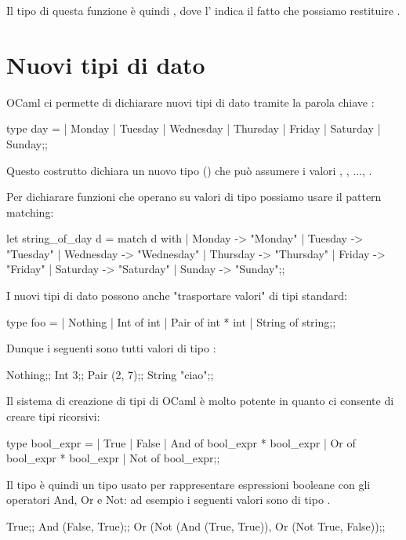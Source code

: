 Il tipo di questa funzione è quindi , dove l' indica il fatto che possiamo restituire .

\section{Nuovi tipi di dato}

OCaml ci permette di dichiarare nuovi tipi di dato tramite la parola chiave :
\begin{OCaml}
    type day = 
        | Monday
        | Tuesday
        | Wednesday
        | Thursday
        | Friday
        | Saturday
        | Sunday;;
\end{OCaml}
Questo costrutto dichiara un nuovo tipo () che può assumere i valori , , ..., .

Per dichiarare funzioni che operano su valori di tipo  possiamo usare il pattern matching:
\begin{OCaml}
    let string_of_day d = 
        match d with
        | Monday    -> "Monday"
        | Tuesday   -> "Tuesday"
        | Wednesday -> "Wednesday"
        | Thursday  -> "Thursday"
        | Friday    -> "Friday"
        | Saturday  -> "Saturday"
        | Sunday    -> "Sunday";;
\end{OCaml}

I nuovi tipi di dato possono anche "trasportare valori" di tipi standard:
\begin{OCaml}
    type foo = 
        | Nothing
        | Int of int
        | Pair of int * int
        | String of string;;
\end{OCaml}
Dunque i seguenti sono tutti valori di tipo :
\begin{OCaml}
    Nothing;;
    Int 3;;
    Pair (2, 7);;
    String "ciao";;
\end{OCaml}

Il sistema di creazione di tipi di OCaml è molto potente in quanto ci consente di creare tipi ricorsivi:
\begin{OCaml}
    type bool_expr = 
        | True
        | False
        | And of bool_expr * bool_expr
        | Or of bool_expr * bool_expr
        | Not of bool_expr;;
\end{OCaml}

Il tipo  è quindi un tipo usato per rappresentare espressioni booleane con gli operatori \textup{And}, \textup{Or} e \textup{Not}: ad esempio i seguenti valori sono di tipo .
\begin{OCaml}
    True;;
    And (False, True);;
    Or (Not (And (True, True)), Or (Not True, False));;
\end{OCaml}

